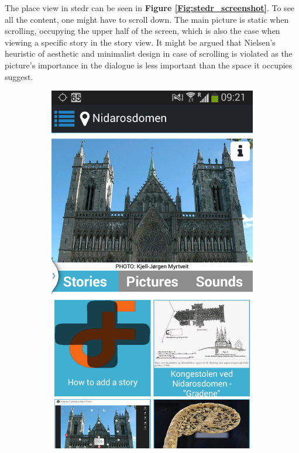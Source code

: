 The place view in stedr can be seen in \textbf{Figure \ref{Fig:stedr_screenshot}}. To see all the content, one might have to scroll down. The main picture is static when scrolling, occupying the upper half of the screen, which is also the case when viewing a specific story in the story view. It might be argued that Nielsen’s heuristic of aesthetic and minimalist design in case of scrolling is violated as the picture's importance in the dialogue is less important than the space it occupies suggest. \newline

\begin{figure}[h]
	\centering
	\begin{subfigure}[t]{0.3\textwidth}
		\includegraphics[width=\textwidth]{fig/stedr_screenshot}

\end{subfigure}
\end{figure}
